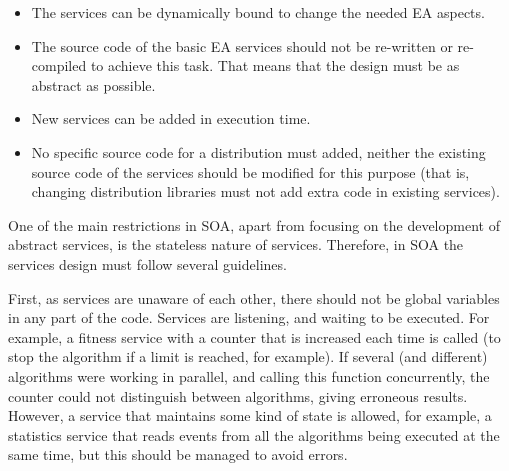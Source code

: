 \begin{itemize}
\item The services can be dynamically bound to change the needed EA aspects. %
\item The source code of  the basic EA services should not be  re-written or re-compiled to achieve this task. That means that the design must be as abstract as possible. %
\item New services can be added in execution time. 
\item No specific source code for a distribution must added, neither  the existing source code of the services should be modified for this purpose (that is, changing distribution libraries must not add extra code in existing services). 
\end{itemize}








One of the main restrictions in SOA, %
 apart from focusing on the development of abstract services, is the
 stateless nature of services. Therefore, in SOA the services design
 must follow several guidelines. %

First, as services are unaware of each other, there should not be global
variables in any part of the code. Services are listening, and waiting
to be executed. For example, a fitness service with a counter that is
increased each time is called (to stop the algorithm if a limit is
reached, for example). If several (and different) algorithms were
working in parallel, and calling this function concurrently, the
counter could not distinguish between algorithms, giving erroneous
results. However, a service that maintains some kind of state is
allowed, for example, a statistics service that reads events from all
the algorithms being executed at the same time, but this should be
managed to avoid errors. %

